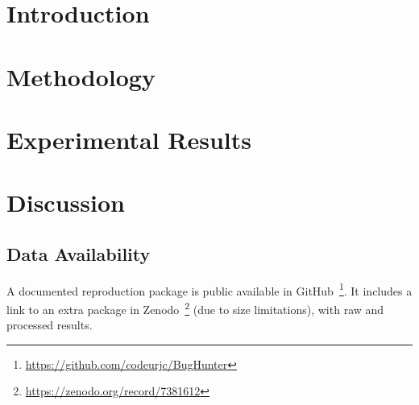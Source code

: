 \minitoc


\section{Introduction}
\label{sec:bug-hunter:intro}


\section{Methodology}
\label{sec:bug-hunter:methodology}


\section{Experimental Results}
\label{sec:bug-hunter:results}


\section{Discussion}
\label{sec:bug-hunter:discussion}


% 

\subsection*{Data Availability}
\label{sec:bug-hunter:repro}

A documented reproduction package is public available in GitHub~\footnote{\url{https://github.com/codeurjc/BugHunter}}. 
It includes a link to an extra package in Zenodo~\footnote{\url{https://zenodo.org/record/7381612}} (due to size limitations), with raw and processed results.
